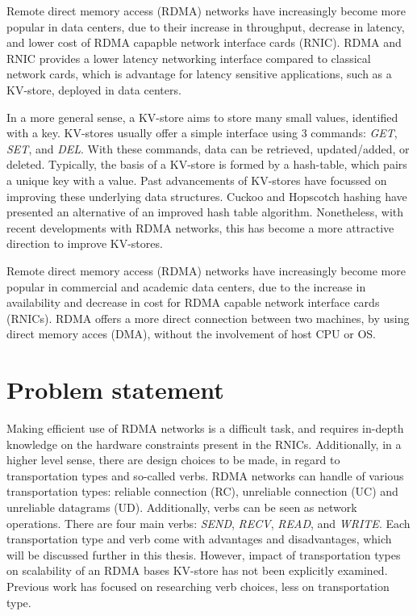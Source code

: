 Remote direct memory access (RDMA) networks have increasingly become more popular in data centers, due to their increase in throughput, decrease in latency, and lower cost of RDMA capapble network interface cards (RNIC)\cite{kalia2016design, chen2019scalable}.
RDMA and RNIC provides a lower latency networking interface compared to classical network cards, which is advantage for latency sensitive applications, such as a KV-store, deployed in data centers.


In a more general sense, a KV-store aims to store many small values, identified with a key.
KV-stores usually offer a simple interface using 3 commands: \textit{GET}, \textit{SET}, and \textit{DEL}.
With these commands, data can be retrieved, updated/added, or deleted.
Typically, the basis of a KV-store is formed by a hash-table, which pairs a unique key with a value.
Past advancements of KV-stores have focussed on improving these underlying data structures\cite{escriva2012hyperdex, lim2014mica}.
Cuckoo and Hopscotch hashing\cite{kalia2014using, FaRM} have presented an alternative of an improved hash table algorithm.
Nonetheless, with recent developments with RDMA networks, this has become a more attractive direction to improve KV-stores\cite{chen2019scalable}.

Remote direct memory access (RDMA) networks have increasingly become more popular in commercial and academic data centers, due to the increase in availability and decrease in cost for RDMA capable network interface cards (RNICs)\cite{kalia2016design, chen2019scalable}.
RDMA offers a more direct connection between two machines, by using direct memory acces (DMA), without the involvement of host CPU or OS.

\section{Problem statement}
Making efficient use of RDMA networks is a difficult task, and requires in-depth knowledge on the hardware constraints present in the RNICs\cite{kalia2016design, chen2019scalable}.
Additionally, in a higher level sense, there are design choices to be made, in regard to transportation types and so-called verbs.
RDMA networks can handle of various transportation types: reliable connection (RC), unreliable connection (UC) and unreliable datagrams (UD).
Additionally, verbs can be seen as network operations.
There are four main verbs: \textit{SEND}, \textit{RECV}, \textit{READ}, and \textit{WRITE}.
Each transportation type and verb come with advantages and disadvantages, which will be discussed further in this thesis.
However, impact of transportation types on scalability of an RDMA bases KV-store has not been explicitly examined.
Previous work has focused on researching verb choices, less on transportation type\cite{kalia2014using, kalia2016fasst, mitchell2013using}.

